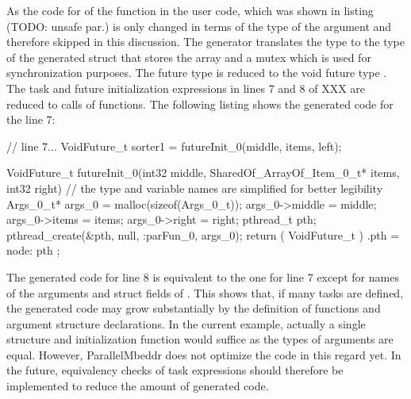 As the code for of the  function in the user code, which was shown in listing (TODO: unsafe par.) is only changed in terms of the type of the  argument and therefore skipped in this discussion. The generator translates the type  to the type of the generated struct  that stores the array and a mutex which is used for synchronization purposes. The future type  is reduced to the void future type . The task and future initialization expressions in lines 7 and 8 of XXX are reduced to calls of  functions. The following listing shows the generated code for the line 7:
\begin{ccode}
  // line 7...
  VoidFuture_t sorter1 = futureInit_0(middle, items, left);


VoidFuture_t futureInit_0(int32 middle, SharedOf_ArrayOf_Item_0_t* items, int32 right) {
  // the type and variable names are simplified for better legibility
  Args_0_t* args_0 = malloc(sizeof(Args_0_t)); 
  args_0->middle = middle; 
  args_0->items = items; 
  args_0->right = right; 
  pthread_t pth; 
  pthread_create(&pth, null, :parFun_0, args_0); 
  return ( VoidFuture_t ){ .pth = node: pth }; 
}
\end{ccode}
The generated code for line 8 is equivalent to the one for line 7 except for names of the arguments and struct fields of . This shows that, if many tasks are defined, the generated code may grow substantially by the definition of  functions and argument structure declarations. In the current example, actually a single structure and initialization function would suffice as the types of arguments are equal. However, ParallelMbeddr does not optimize the code in this regard yet. In the future, equivalency checks of task expressions should therefore be implemented to reduce the amount of generated code.


